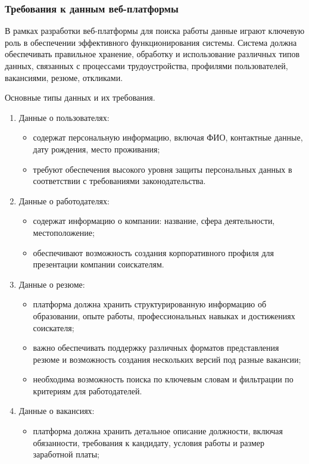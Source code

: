 \subsubsection{Требования к данным веб-платформы}
В рамках разработки веб-платформы для поиска работы данные играют ключевую роль в обеспечении эффективного функционирования системы. Система должна обеспечивать правильное хранение, обработку и использование различных типов данных, связанных с процессами трудоустройства, профилями пользователей, вакансиями, резюме, откликами.

Основные типы данных и их требования.

\begin{enumerate}
	\item Данные о пользователях:
	\begin{itemize}
		\item содержат персональную информацию, включая ФИО, контактные данные, дату рождения, место проживания;
		\item требуют обеспечения высокого уровня защиты персональных данных в соответствии с требованиями законодательства.
	\end{itemize}
	\item Данные о работодателях:
	\begin{itemize}
		\item содержат информацию о компании: название, сфера деятельности, местоположение;
		\item обеспечивают возможность создания корпоративного профиля для презентации компании соискателям.
	\end{itemize}
	\item Данные о резюме:
	\begin{itemize}
		\item платформа должна хранить структурированную информацию об образовании, опыте работы, профессиональных навыках и достижениях соискателя;
		\item важно обеспечивать поддержку различных форматов представления резюме и возможность создания нескольких версий под разные вакансии;
		\item необходима возможность поиска по ключевым словам и фильтрации по критериям для работодателей.
	\end{itemize}
	\item Данные о вакансиях:
	\begin{itemize}
		\item платформа должна хранить детальное описание должности, включая обязанности, требования к кандидату, условия работы и размер заработной платы;

\end{itemize}
\end{enumerate}
